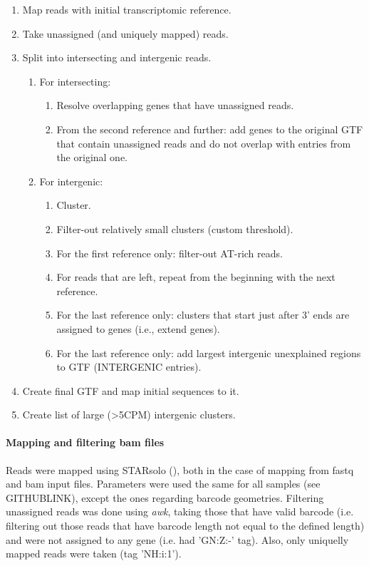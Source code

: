 {\begin{enumerate}
    \item Map reads with initial transcriptomic reference.
    \item Take unassigned (and uniquely mapped) reads.
    \item Split into intersecting and intergenic reads.
    \begin{enumerate}
        \item For intersecting:
        \begin{enumerate}
            \item Resolve overlapping genes that have unassigned reads.
            \item From the second reference and further: add genes to the original GTF that contain unassigned reads
            and do not overlap with entries from the original one.
        \end{enumerate}
        \item For intergenic:
        \begin{enumerate}
            \item Cluster.
            \item Filter-out relatively small clusters (custom threshold).
            \item For the first reference only: filter-out AT-rich reads.
            \item For reads that are left, repeat from the beginning with the next reference.
            \item For the last reference only: clusters that start just after 3' ends are assigned to genes (i.e., extend genes).
            \item For the last reference only: add largest intergenic unexplained regions to GTF (INTERGENIC entries).
        \end{enumerate}
    \end{enumerate}
    \item Create final GTF and map initial sequences to it.
    \item Create list of large (\textgreater 5CPM) intergenic clusters.
\end{enumerate}

\paragraph{Mapping and filtering bam files}
Reads were mapped using STARsolo (\cite{Kaminow2021}), both in the case of mapping from fastq and bam input files.
Parameters were used the same for all samples (see GITHUBLINK), except the ones regarding barcode geometries.
Filtering unassigned reads was done using \textit{awk}, taking those that have valid barcode
(i.e. filtering out those reads that have barcode length not equal to the defined length)
and were not assigned to any gene (i.e. had 'GN:Z:-' tag).
Also, only uniquelly mapped reads were taken (tag 'NH:i:1').

}
